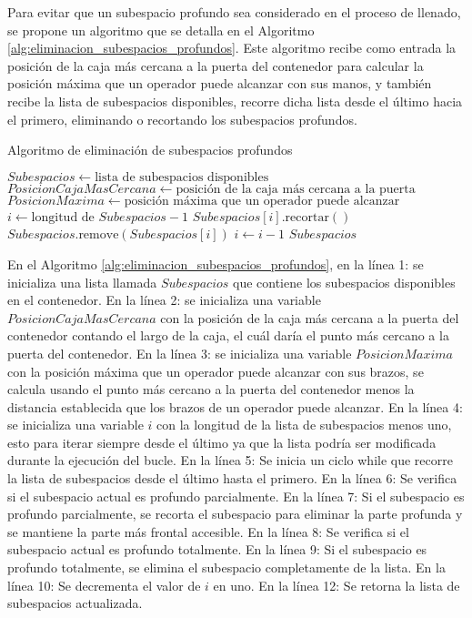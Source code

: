 Para evitar que un subespacio profundo sea considerado en el proceso de llenado, se propone un algoritmo que se detalla en el Algoritmo \ref{alg:eliminacion_subespacios_profundos}. Este algoritmo recibe como entrada la posición de la caja más cercana a la puerta del contenedor para calcular la posición máxima que un operador puede alcanzar con sus manos, y también recibe la lista de subespacios disponibles, recorre dicha lista desde el último hacia el primero, eliminando o recortando los subespacios profundos.

\begin{algorithm}[H]
    \caption{Algoritmo de eliminación de subespacios profundos}
    \label{alg:eliminacion_subespacios_profundos}
    \begin{algorithmic}[1]
        \State $Subespacios \gets \text{lista de subespacios disponibles}$
        \State $PosicionCajaMasCercana \gets \text{posición de la caja más cercana a la puerta}$
        \State $PosicionMaxima \gets \text{posición máxima que un operador puede alcanzar}$
        \State $i \gets \text{longitud de } Subespacios - 1$
        \State $Subespacios[i].\text{recortar}()$
        \State $Subespacios.\text{remove}(Subespacios[i])$
        \EndIf
        \State $i \gets i - 1$
        \EndWhile
        \State \Return $Subespacios$
    \end{algorithmic}
\end{algorithm}

En el Algoritmo \ref{alg:eliminacion_subespacios_profundos}, en la línea 1: se inicializa una lista llamada $Subespacios$ que contiene los subespacios disponibles en el contenedor. En la línea 2: se inicializa una variable $PosicionCajaMasCercana$ con la posición de la caja más cercana a la puerta del contenedor contando el largo de la caja, el cuál daría el punto más cercano a la puerta del contenedor. En la línea 3: se inicializa una variable $PosicionMaxima$ con la posición máxima que un operador puede alcanzar con sus brazos, se calcula usando el punto más cercano a la puerta del contenedor menos la distancia establecida que los brazos de un operador puede alcanzar. En la línea 4: se inicializa una variable $i$ con la longitud de la lista de subespacios menos uno, esto para iterar siempre desde el último ya que la lista podría ser modificada durante la ejecución del bucle. En la línea 5: Se inicia un ciclo while que recorre la lista de subespacios desde el último hasta el primero. En la línea 6: Se verifica si el subespacio actual es profundo parcialmente. En la línea 7: Si el subespacio es profundo parcialmente, se recorta el subespacio para eliminar la parte profunda y se mantiene la parte más frontal accesible. En la línea 8: Se verifica si el subespacio actual es profundo totalmente. En la línea 9: Si el subespacio es profundo totalmente, se elimina el subespacio completamente de la lista. En la línea 10: Se decrementa el valor de $i$ en uno. En la línea 12: Se retorna la lista de subespacios actualizada.


